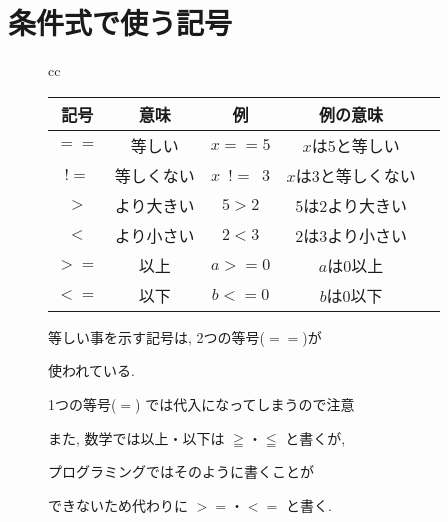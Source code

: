 \documentclass[dvipdfmx]{jsbook}
\begin{document}
\section{条件式で使う記号}
\begin{figure}[htp]
	\begin{tabular}{cc}
		\begin{minipage}[c]{.5\textwidth}
			\begin{tabular}[t]{|c|c|c|c|c|}
				\hline
				記号 & 意味       & 例             & 例の意味           \\
				\hline \hline
				$==$ & 等しい     & $x == 5$       & $x$は5と等しい     \\ \hline
				$!=$ & 等しくない & $x$\, $!=$ \,3 & $x$は3と等しくない \\ \hline
				$>$  & より大きい & $5 > 2$        & 5は2より大きい     \\ \hline
				$<$  & より小さい & $2 < 3$        & 2は3より小さい     \\ \hline
				$>=$ & 以上       & $a >= 0$       & $a$は0以上         \\ \hline
				$<=$ & 以下       & $b <= 0$       & $b$は0以下         \\ \hline
			\end{tabular}
		\end{minipage}
		\begin{minipage}[c]{.465\textwidth}
			\begin{screen}
				等しい事を示す記号は, 2つの等号($==$)が \par 使われている.  \par
				1つの等号($=$) では代入になってしまうので注意 \par
				また, 数学では以上・以下は $\geqq$・$\leqq$ と書くが, \par プログラミングではそのように書くことが \par できないため代わりに $>=$・$<=$ と書く.
			\end{screen}
		\end{minipage}
	\end{tabular}
\end{figure}
\newpage
\end{document}
